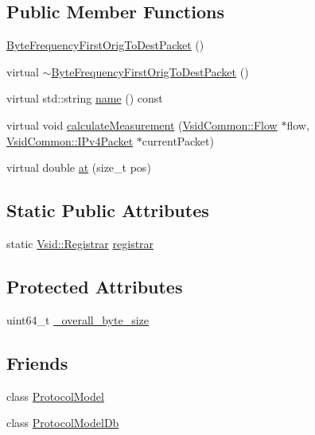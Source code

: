 \subsection*{Public Member Functions}
\begin{DoxyCompactItemize}
\item 
\hyperlink{class_vsid_1_1_byte_frequency_first_orig_to_dest_packet_ac2808ce007b5a83846fa0571f508fffb}{Byte\-Frequency\-First\-Orig\-To\-Dest\-Packet} ()
\item 
virtual \hyperlink{class_vsid_1_1_byte_frequency_first_orig_to_dest_packet_a00aacc5963a4ebc9ba0a00cddd9d3571}{$\sim$\-Byte\-Frequency\-First\-Orig\-To\-Dest\-Packet} ()
\item 
virtual std\-::string \hyperlink{class_vsid_1_1_byte_frequency_first_orig_to_dest_packet_afe5165442500735389c683bd8c91cbdd}{name} () const 
\item 
virtual void \hyperlink{class_vsid_1_1_byte_frequency_first_orig_to_dest_packet_a81834b3f4236f6c53b7114c9b22e6f56}{calculate\-Measurement} (\hyperlink{class_vsid_common_1_1_flow}{Vsid\-Common\-::\-Flow} $\ast$flow, \hyperlink{class_vsid_common_1_1_i_pv4_packet}{Vsid\-Common\-::\-I\-Pv4\-Packet} $\ast$current\-Packet)
\item 
virtual double \hyperlink{class_vsid_1_1_byte_frequency_first_orig_to_dest_packet_a60c657add025410076184f5bc88bee4b}{at} (size\-\_\-t pos)
\end{DoxyCompactItemize}
\subsection*{Static Public Attributes}
\begin{DoxyCompactItemize}
\item 
static \hyperlink{class_vsid_1_1_registrar}{Vsid\-::\-Registrar} \hyperlink{class_vsid_1_1_byte_frequency_first_orig_to_dest_packet_aa7c68993e8cec93d93cedfb9c6924bfb}{registrar}
\end{DoxyCompactItemize}
\subsection*{Protected Attributes}
\begin{DoxyCompactItemize}
\item 
uint64\-\_\-t \hyperlink{class_vsid_1_1_byte_frequency_first_orig_to_dest_packet_afaa99faf2c05ab93ed2cc21e581c4ece}{\-\_\-overall\-\_\-byte\-\_\-size}
\end{DoxyCompactItemize}
\subsection*{Friends}
\begin{DoxyCompactItemize}
\item 
class \hyperlink{class_vsid_1_1_byte_frequency_first_orig_to_dest_packet_a80219b863d4ff3456933d16bc5f73f45}{Protocol\-Model}
\item 
class \hyperlink{class_vsid_1_1_byte_frequency_first_orig_to_dest_packet_a3c0d389e7a9476b06313d8fb9ca9fe68}{Protocol\-Model\-Db}
\end{DoxyCompactItemize}


